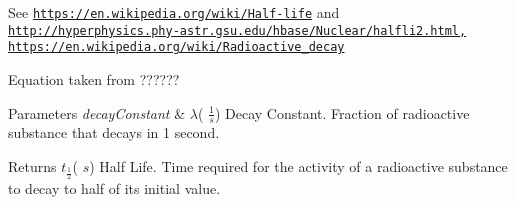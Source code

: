 See \href{https://en.wikipedia.org/wiki/Half-life}{\tt https\+://en.\+wikipedia.\+org/wiki/\+Half-\/life} and \href{http://hyperphysics.phy-astr.gsu.edu/hbase/Nuclear/halfli2.html,}{\tt http\+://hyperphysics.\+phy-\/astr.\+gsu.\+edu/hbase/\+Nuclear/halfli2.\+html,} \href{https://en.wikipedia.org/wiki/Radioactive_decay}{\tt https\+://en.\+wikipedia.\+org/wiki/\+Radioactive\+\_\+decay}

Equation taken from ??????


\begin{DoxyParams}{Parameters}
{\em decay\+Constant} & $\lambda$( $\frac{1}{s}$) Decay Constant. Fraction of radioactive substance that decays in 1 second. \\
\hline
\end{DoxyParams}
\begin{DoxyReturn}{Returns}
$t_{\frac{1}{2}}$( $s$) Half Life. Time required for the activity of a radioactive substance to decay to half of its initial value. 
\end{DoxyReturn}
